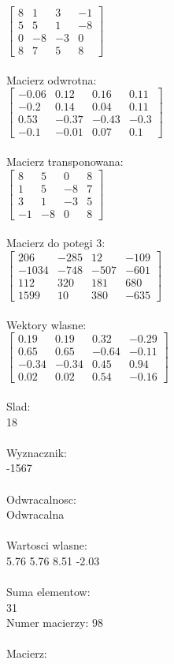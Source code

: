 \documentclass[a4paper,12pt]{article}
\begin{document}
$\begin{bmatrix} 8&1&3&-1\\5&5&1&-8\\0&-8&-3&0\\8&7&5&8 \end{bmatrix}$
\\
\\
Macierz odwrotna:\\

$\begin{bmatrix} -0.06&0.12&0.16&0.11\\-0.2&0.14&0.04&0.11\\0.53&-0.37&-0.43&-0.3\\-0.1&-0.01&0.07&0.1 \end{bmatrix}$
\\
\\
Macierz transponowana:\\

$\begin{bmatrix} 8&5&0&8\\1&5&-8&7\\3&1&-3&5\\-1&-8&0&8 \end{bmatrix}$
\\
\\
Macierz do potegi 3:\\

$\begin{bmatrix} 206&-285&12&-109\\-1034&-748&-507&-601\\112&320&181&680\\1599&10&380&-635 \end{bmatrix}$
\\
\\
Wektory wlasne:\\

$\begin{bmatrix} 0.19&0.19&0.32&-0.29\\0.65&0.65&-0.64&-0.11\\-0.34&-0.34&0.45&0.94\\0.02&0.02&0.54&-0.16 \end{bmatrix}$
\\
\\
Slad:\\
18
\\
\\
Wyznacznik:\\
-1567
\\
\\
Odwracalnosc:\\
Odwracalna
\\
\\
Wartosci wlasne:\\
5.76 5.76 8.51 -2.03
\\
\\
Suma elementow:\\
31
\\
\newpage
Numer macierzy:
98
\\
\\
Macierz:\\
\end{document}
